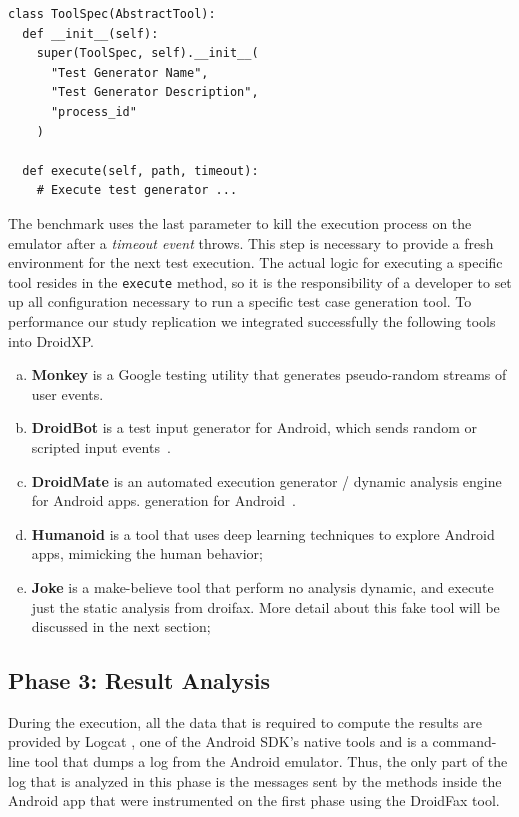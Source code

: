 \begin{lstlisting}[caption=ToolSpec Sample,label={lst:toolspec}]
class ToolSpec(AbstractTool):
  def __init__(self):
    super(ToolSpec, self).__init__(
      "Test Generator Name", 
      "Test Generator Description", 
      "process_id"
    )
        
  def execute(self, path, timeout):
    # Execute test generator ...
\end{lstlisting}

The benchmark uses the last parameter to kill the execution process
on the emulator after a \emph{timeout event} throws.
This step is necessary to provide a fresh environment
for the next test execution. The actual logic for executing a
specific tool resides in the  \texttt{execute} method,
so it is the responsibility of a developer to
set up all configuration necessary to run a specific
test case generation tool. To performance our study replication we integrated successfully 
the following tools into DroidXP. 

\begin{enumerate}[(a)]
  \item {\bf Monkey} is a Google testing utility that generates
    pseudo-random streams of user events. 
    \item {\bf DroidBot}  is a test input generator for
       Android, which sends random or scripted input events~\cite{li2017droidbot}. 
    \item {\bf DroidMate} is an automated execution generator /
      dynamic analysis engine for Android apps\cite{jamrozik2016droidmate}. 
      generation for Android~\cite{mao2016sapienz}. 
    \item {\bf Humanoid} is a tool that uses deep learning techniques to explore Android apps, mimicking the human behavior\cite{li2019deep}; 
    \item {\bf Joke} is a make-believe tool that perform no analysis dynamic, and execute just the static analysis from droifax. More detail about this fake tool will be discussed in the next section; 
\end{enumerate}

\subsection{Phase 3: Result Analysis}

During the execution, all the data that is required to compute the results are provided by Logcat \cite{Logcat}, one of the Android SDK's native tools and is a command-line tool that dumps a log from the Android emulator. Thus, the only part of the log that is analyzed in this phase is the messages sent by the methods inside the Android app that were instrumented on the first phase using the DroidFax tool. 

